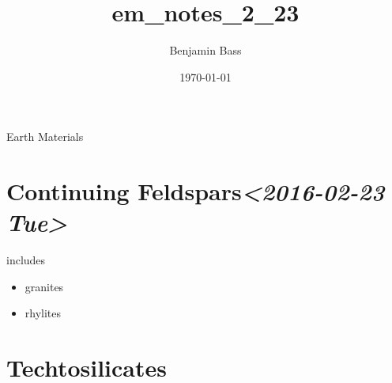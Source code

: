 \documentclass[11pt]{article}
\author{Benjamin Bass}
\date{\today}
\title{em\_notes\_2\_23}
\begin{document}
\maketitle
\tableofcontents

Earth Materials


\section{Continuing Feldspars\textit{<2016-02-23 Tue>}}
\label{sec-1}


includes 
\begin{itemize}
\item granites
\item rhylites
\end{itemize}
\section{Techtosilicates}
\label{sec-2}
\end{document}
